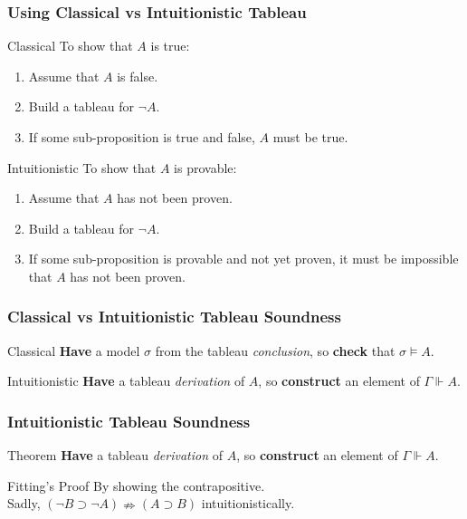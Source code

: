 \documentclass[mathserif]{beamer}
\def\imp{\supset}
\newcommand{\sat}[1]{\sigma \vDash #1}
\newcommand{\force}[1]{\Gamma \Vdash #1}
\begin{document}
\begin{frame}
\frametitle{Using Classical vs Intuitionistic Tableau}

\begin{block}{Classical}
To show that $A$ is true:
\begin{enumerate}
\item Assume that $A$ is false.
\item Build a tableau for $\neg A$.
\item If some sub-proposition is true and false, $A$ must be true.
\end{enumerate}
\end{block}

\begin{block}{Intuitionistic}
To show that $A$ is provable:
\begin{enumerate}
\item Assume that $A$ has not been proven.
\item Build a tableau for $\neg A$.
\item If some sub-proposition is provable and not yet proven,
it must be impossible that $A$ has not been proven.
\end{enumerate}
\end{block}

\end{frame}

\begin{frame}
\frametitle{Classical vs Intuitionistic Tableau Soundness}

\begin{block}{Classical}
{\bf Have} a model $\sigma$ from the tableau {\it conclusion}, so
{\bf check} that $\sat{A}$.
\end{block}

\begin{block}{Intuitionistic}
{\bf Have} a tableau {\it derivation} of $A$, so
{\bf construct} an element of $\force{A}$.
\end{block}

\end{frame}

\begin{frame}
\frametitle{Intuitionistic Tableau Soundness}

\begin{block}{Theorem}
{\bf Have} a tableau {\it derivation} of $A$, so
{\bf construct} an element of $\force{A}$.
\end{block}

\begin{block}{Fitting's Proof}
By showing the contrapositive.\\
Sadly, $(\neg B \imp \neg A) \nRightarrow (A \imp B)$ intuitionistically.
\end{block}

\end{frame}
\end{document}
